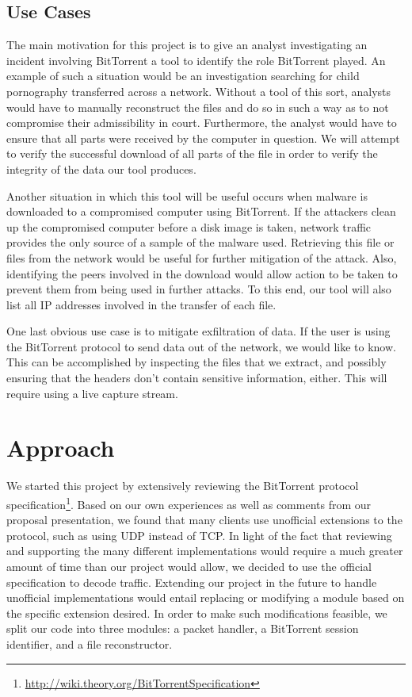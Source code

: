 \documentclass{acm_proc_article-sp}
\begin{document}
\subsection{Use Cases}
The main motivation for this project is to give an analyst investigating an
incident involving BitTorrent a tool to identify the role BitTorrent played.  An
example of such a situation would be an investigation searching for child
pornography transferred across a network. Without a tool of this sort, analysts
would have to manually reconstruct the files and do so in such a way as to not
compromise their admissibility in court. Furthermore, the analyst would have to
ensure that all parts were received by the computer in question. We will attempt
to verify the successful download of all parts of the file in order to verify
the integrity of the data our tool produces.

Another situation in which this tool will be useful occurs when malware is
downloaded to a compromised computer using BitTorrent. If the attackers clean up
the compromised computer before a disk image is taken, network traffic
provides the only source of a sample of the malware used. Retrieving this file
or files from the network would be useful for further mitigation of the
attack. Also, identifying the peers involved in the download would allow action
to be taken to prevent them from being used in further attacks. To this end, our
tool will also list all IP addresses involved in the transfer of each file.

One last obvious use case is to mitigate exfiltration of data.  If the user is
using the BitTorrent protocol to send data out of the network, we would like to
know.  This can be accomplished by inspecting the files that we extract, and
possibly ensuring that the headers don't contain sensitive information, either.
This will require using a live capture stream.



\section{Approach}
We started this project by extensively reviewing the BitTorrent protocol
specification\footnote{\url{http://wiki.theory.org/BitTorrentSpecification}}.
Based on our own experiences as well as comments from our proposal presentation,
we found that many clients use unofficial extensions to the protocol, such as
using UDP instead of TCP. In light of the fact that reviewing and supporting
the many different implementations would require a much greater amount of time
than our project would allow, we decided to use the official specification to
decode traffic. Extending our project in the future to handle unofficial
implementations would entail replacing or modifying  a module based on the
specific extension desired. In order to make such modifications feasible, we
split our code into three modules: a packet handler, a BitTorrent session
identifier, and a file reconstructor.
\end{document}

